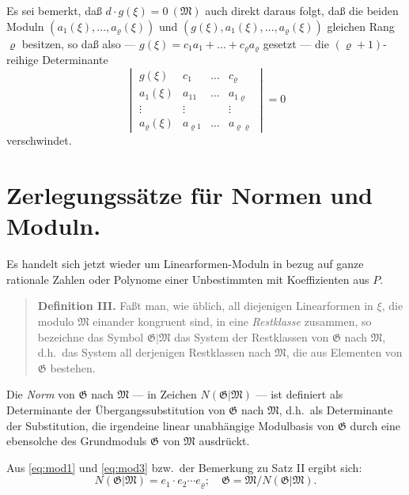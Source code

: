 \documentclass[fontsize=10pt,paper=a5,pagesize,headings=small]{scrbook}
\theoremstyle{plain}
\begin{document}
Es sei bemerkt, daß $d \cdot g(\xi) = 0\ (\mathfrak{M})$ auch direkt daraus folgt, daß die beiden
Moduln $(a_1(\xi),\dots,a_\varrho(\xi))$ und $(g(\xi),a_1(\xi),\dots,a_\varrho(\xi))$ gleichen Rang $\varrho$ besitzen,
so daß also --- $g(\xi) = c_1 a_1 + \dots + c_\varrho a_\varrho$ gesetzt --- die $(\varrho+1)$-reihige Determinante
\[
\begin{vmatrix}
g(\xi) & c_1 & \dots & c_\varrho \\
a_1(\xi) & a_{11} & \dots & a_{1\varrho} \\
\vdots & \vdots & & \vdots \\
a_\varrho(\xi) & a_{\varrho 1} & \dots & a_{\varrho\varrho}
\end{vmatrix}
= 0
\]
verschwindet.

\section{Zerlegungssätze für Normen und Moduln.}
\setcounter{section}{2}

Es handelt sich jetzt wieder um Linearformen-Moduln in bezug auf ganze
rationale Zahlen oder Polynome einer Unbestimmten mit Koeffizienten aus $P$.

\begin{quote}
\textbf{Definition III.} Faßt man, wie üblich, all diejenigen Linearformen in $\xi$,
die modulo $\mathfrak{M}$ einander kongruent sind, in eine \textit{Restklasse} zusammen, so bezeichne
das Symbol $\mathfrak{G}|\mathfrak{M}$ das System der Restklassen von $\mathfrak{G}$ nach $\mathfrak{M}$, d.h.~das System all derjenigen
Restklassen nach $\mathfrak{M}$, die aus Elementen von $\mathfrak{G}$ bestehen.
\end{quote}

Die \textit{Norm} von $\mathfrak{G}$ nach $\mathfrak{M}$ --- in Zeichen $N(\mathfrak{G}|\mathfrak{M})$ --- ist definiert als Determinante der
Übergangssubstitution von $\mathfrak{G}$ nach $\mathfrak{M}$, d.h.~als Determinante der Substitution, die irgendeine
linear unabhängige Modulbasis von $\mathfrak{G}$ durch eine ebensolche des Grundmoduls $\mathfrak{G}$ von $\mathfrak{M}$
ausdrückt.

Aus \eqref{eq:mod1} und \eqref{eq:mod3} bzw.~der Bemerkung zu Satz II ergibt sich:
\begin{equation}
\label{eq:mod9}
N(\mathfrak{G}|\mathfrak{M}) = e_1 \cdot e_2 \cdots e_\varrho;\quad \mathfrak{G} = \mathfrak{M}/N(\mathfrak{G}|\mathfrak{M}).
\end{equation}
\end{document}
